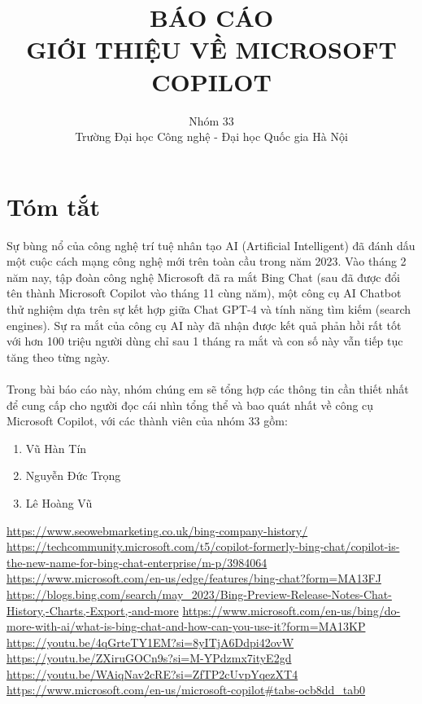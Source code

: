 \documentclass{report}
\title{\textbf{\Large BÁO CÁO\\ GIỚI THIỆU VỀ MICROSOFT COPILOT}}
\author{Nhóm 33\\ Trường Đại học Công nghệ - Đại học Quốc gia Hà Nội}
\begin{document}
\maketitle
\chapter*{Tóm tắt}
Sự bùng nổ của công nghệ trí tuệ nhân tạo AI (Artificial Intelligent) đã đánh dấu một cuộc cách mạng công nghệ mới trên toàn cầu trong năm 2023.
Vào tháng 2 năm nay, tập đoàn công nghệ Microsoft đã ra mắt Bing Chat (sau đã được đổi tên thành Microsoft Copilot vào tháng 11 cùng năm), một công cụ AI Chatbot thử nghiệm dựa trên sự kết hợp giữa Chat GPT-4 và tính năng tìm kiếm (search engines).
Sự ra mắt của công cụ AI này đã nhận được kết quả phản hồi rất tốt với hơn 100 triệu người dùng chỉ sau 1 tháng ra mắt và con số này vẫn tiếp tục tăng theo từng ngày.
\\ \\Trong bài báo cáo này, nhóm chúng em sẽ tổng hợp các thông tin cần thiết nhất để cung cấp cho người đọc cái nhìn tổng thể và bao quát nhất về công cụ Microsoft Copilot,
với các thành viên của nhóm 33 gồm: \begin{enumerate}
    \item Vũ Hàn Tín
    \item Nguyễn Đức Trọng
    \item Lê Hoàng Vũ
\end{enumerate}
\tableofcontents
\listoffigures




% 
% 
\begin{thebibliography}{1}
  \url{https://www.seowebmarketing.co.uk/bing-company-history/}
  \url{https://techcommunity.microsoft.com/t5/copilot-formerly-bing-chat/copilot-is-the-new-name-for-bing-chat-enterprise/m-p/3984064}
   \url{https://www.microsoft.com/en-us/edge/features/bing-chat?form=MA13FJ}
  \url{https://blogs.bing.com/search/may_2023/Bing-Preview-Release-Notes-Chat-History,-Charts,-Export,-and-more} 
    \url{https://www.microsoft.com/en-us/bing/do-more-with-ai/what-is-bing-chat-and-how-can-you-use-it?form=MA13KP}
 \url{https://youtu.be/4qGrteTY1EM?si=8yITjA6Ddpi42ovW}
 \url{https://youtu.be/ZXiruGOCn9s?si=M-YPdzmx7ityE2gd}
    \url{https://youtu.be/WAiqNav2cRE?si=ZfTP2cUvpYqezXT4}
 \url{https://www.microsoft.com/en-us/microsoft-copilot#tabs-ocb8dd_tab0}
\end{thebibliography}
\end{document}
